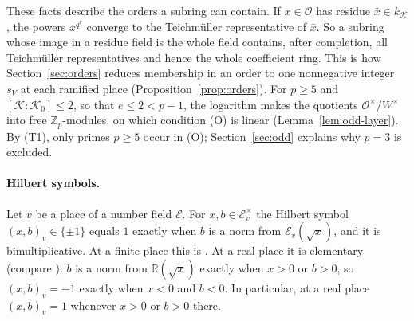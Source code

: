 \documentclass[11pt]{article}
\theoremstyle{plain}
\theoremstyle{definition}
\theoremstyle{remark}
\newcommand{\Z}{\mathbb Z}
\newcommand{\OO}{\mathcal O}
\begin{document}
These facts describe the orders a subring can contain.  If $x\in\OO$ has
residue $\bar x\in k_{\mathcal K}$, the powers $x^{q^r}$ converge to the
Teichmüller representative of $\bar x$.  So a subring whose image in a
residue field is the whole field contains, after completion, all
Teichmüller representatives and hence the whole coefficient ring.  This is
how Section~\ref{sec:orders} reduces membership in an order to one
nonnegative integer $s_V$ at each ramified place
(Proposition~\ref{prop:orders}).  For $p\ge5$ and $[\mathcal K:\mathcal K_0]\le2$, so that $e\le2<p-1$, the
logarithm makes the quotients $\OO^\times/W^\times$ into free $\Z_p$-modules, on which
condition (O) is linear (Lemma~\ref{lem:odd-layer}).  By (T1), only
primes $p\ge5$ occur in (O); Section~\ref{sec:odd} explains why $p=3$ is
excluded.

\paragraph{Hilbert symbols.}  Let $v$ be a place of a number field
$\mathcal E$.  For $x,b\in\mathcal E_v^\times$ the Hilbert symbol
$(x,b)_v\in\{\pm1\}$ equals $1$ exactly when $b$ is a norm from
$\mathcal E_v(\sqrt x)$, and it is bimultiplicative.  At a finite place
this is \cite[Chapter~III, Theorem~4.4(a),(d)]{MilneCFT}.  At a real
place it is elementary (compare \cite[Chapter~III, Remark~4.8]{MilneCFT}):
$b$ is a norm from $\mathbb R(\sqrt x)$ exactly when $x>0$ or $b>0$, so
$(x,b)_v=-1$ exactly when $x<0$ and $b<0$.  In particular, at a real place
$(x,b)_v=1$ whenever $x>0$ or $b>0$ there.
\end{document}
